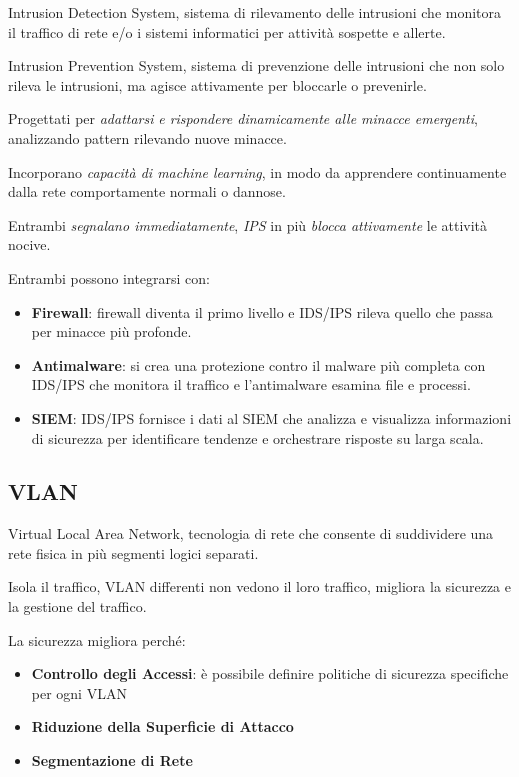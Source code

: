 Intrusion Detection System, sistema di rilevamento delle intrusioni che
monitora il traffico di rete e/o i sistemi informatici per attività
sospette e allerte.

Intrusion Prevention System, sistema di prevenzione delle intrusioni che
non solo rileva le intrusioni, ma agisce attivamente per bloccarle o
prevenirle.

Progettati per \emph{adattarsi} \emph{e rispondere dinamicamente alle
minacce emergenti}, analizzando pattern rilevando nuove minacce.

Incorporano \emph{capacità di machine learning}, in modo da apprendere
continuamente dalla rete comportamente normali o dannose.

Entrambi \emph{segnalano immediatamente}, \emph{IPS} in più \emph{blocca
attivamente} le attività nocive.

Entrambi possono integrarsi con:

\begin{itemize}
\item
  \textbf{Firewall}: firewall diventa il primo livello e IDS/IPS rileva
  quello che passa per minacce più profonde.
\item
  \textbf{Antimalware}: si crea una protezione contro il malware più
  completa con IDS/IPS che monitora il traffico e l'antimalware esamina
  file e processi.
\item
  \textbf{SIEM}: IDS/IPS fornisce i dati al SIEM che analizza e
  visualizza informazioni di sicurezza per identificare tendenze e
  orchestrare risposte su larga scala.
\end{itemize}

\subsection{VLAN}\label{vlan}

Virtual Local Area Network, tecnologia di rete che consente di
suddividere una rete fisica in più segmenti logici separati.

Isola il traffico, VLAN differenti non vedono il loro traffico, migliora
la sicurezza e la gestione del traffico.

La sicurezza migliora perché:

\begin{itemize}
\item
  \textbf{Controllo degli Accessi}: è possibile definire politiche di
  sicurezza specifiche per ogni VLAN
\item
  \textbf{Riduzione della Superficie di Attacco}
\item
  \textbf{Segmentazione di Rete}
\end{itemize}

